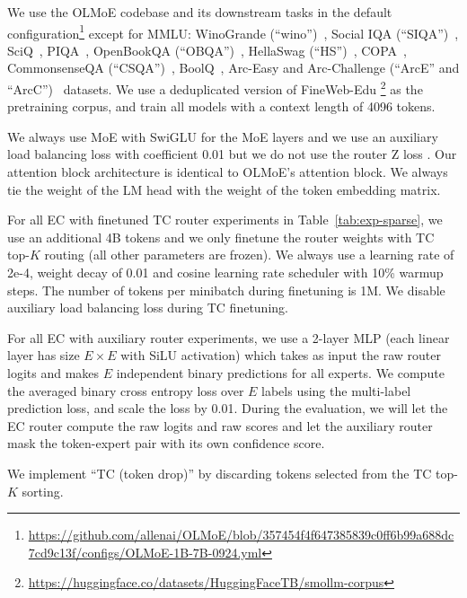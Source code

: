 We use the OLMoE codebase and its downstream tasks in the default configuration\footnote{\scriptsize \url{https://github.com/allenai/OLMoE/blob/357454f4f647385839c0ff6b99a688dc7cd9c13f/configs/OLMoE-1B-7B-0924.yml}} except for MMLU: WinoGrande (``wino'')~\citep{sakaguchi2020winogrande}, Social IQA (``SIQA'')~\citep{sap2019socialiqa}, SciQ~\citep{SciQ}, PIQA~\citep{piqa}, OpenBookQA (``OBQA'')~\citep{OpenBookQA2018}, HellaSwag (``HS'')~\citep{zellers2019hellaswag}, COPA~\citep{roemmele2011choice}, CommonsenseQA (``CSQA'')~\citep{csqa}, BoolQ~\citep{boolq}, Arc-Easy and Arc-Challenge (``ArcE'' and ``ArcC'')~\citep{arc} datasets. We use a deduplicated version of FineWeb-Edu \citep{benallal2024smollmcorpus}\footnote{\scriptsize \url{https://huggingface.co/datasets/HuggingFaceTB/smollm-corpus}} as the pretraining corpus, and train all models with a context length of 4096 tokens.

We always use MoE with SwiGLU for the MoE layers and we use an auxiliary load balancing loss \citep{shazeer2017outrageouslylargeneuralnetworks} with coefficient 0.01 but we do not use the router Z loss \citep{zoph2022st}. Our attention block architecture is identical to OLMoE's attention block. We always tie the weight of the LM head with the weight of the token embedding matrix. 




For all EC with finetuned TC router experiments in Table~\ref{tab:exp-sparse}, we use an additional 4B tokens and we only finetune the router weights with TC top-$K$ routing (all other parameters are frozen). We always use a learning rate of 2e-4, weight decay of 0.01 and cosine learning rate scheduler with 10\% warmup steps. The number of tokens per minibatch during finetuning is 1M. We disable auxiliary load balancing loss during TC finetuning. 

For all EC with auxiliary router experiments, we use a 2-layer MLP (each linear layer has size $E\times E$ with SiLU activation) which takes as input the raw router logits and makes $E$ independent binary predictions for all experts. We compute the averaged binary cross entropy loss over $E$ labels using the multi-label prediction loss, and scale the loss by 0.01. During the evaluation, we will let the EC router compute the raw logits and raw scores and let the auxiliary router mask the token-expert pair with its own confidence score.

We implement ``TC (token drop)'' by discarding tokens selected from the TC top-$K$ sorting.